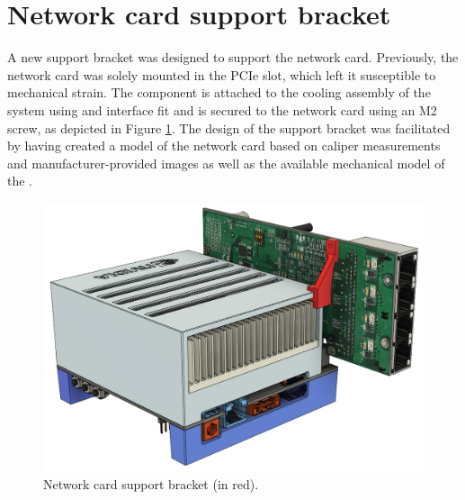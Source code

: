 \clearpage
\section{Network card support bracket}
A new support bracket was designed to support the network card.
Previously, the network card was solely mounted in the PCIe slot, which left it susceptible to mechanical strain.
The component is attached to the cooling assembly of the \jx system using and interface fit and is secured to the network card using an M2 screw, as depicted in Figure \ref{fig:network_card_support}.
The design of the support bracket was facilitated by having created a model of the network card based on caliper measurements and manufacturer-provided images as well as the available mechanical model of the \jx \cite{mucahittoygarNVIDIAJetsonAGX2019}.


\begin{figure}[H]
    \centering
    \includegraphics[width=.6\textwidth]{figures/3d_print/support.jpg}
    \caption{Network card support bracket (in red).}
    \label{fig:network_card_support}
\end{figure}